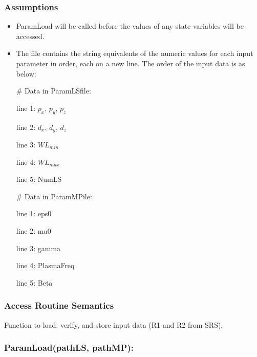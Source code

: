 \documentclass[12pt, titlepage]{article}
\begin{document}
	\subsubsection{Assumptions} \begin{itemize}
		
		\item ParamLoad will be called before the values of any state variables will be
		accessed.
		
		\item The file contains the string equivalents of the numeric values for each
		input parameter in order, each on a new line. The order of the input data is as
		below:
		
		\# Data in ParamLSfile:
		
		line 1: $p_x$, $p_y$, $p_z$
		
		line 2: $d_x$, $d_y$, $d_z$
		
		line 3: $WL_{min}$
		
		line 4: $WL_{max}$
		
		line 5: NumLS
		
		\# Data in ParamMPile:
		
		line 1: eps0
		
		line 2: mu0
		
		line 3: gamma
		
		line 4: PlasmaFreq
		
		line 5: Beta
		
		
	\end{itemize}
	
	\subsubsection{Access Routine Semantics}
	
	Function to load, verify, and store input data (R1 and R2 from SRS).
	
	\subsubsection*{ParamLoad(pathLS, pathMP):}
	
\end{document}
